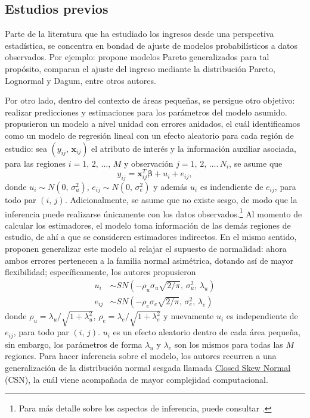 \documentclass[11pt]{article}
\begin{document}
\subsection{Estudios previos}
\label{subsec:estudios-previos}

Parte de la literatura que ha estudiado los ingresos desde una perspectiva estadística, se concentra en bondad de ajuste de modelos probabilísticos a datos observados. Por ejemplo: \textcite{arnold:2015} propone modelos Pareto generalizados para tal propósito, \textcite{sergio:2012} comparan el ajuste del  ingreso mediante la distribución Pareto, Lognormal y Dagum, entre otros autores.

Por otro lado, dentro del contexto de áreas pequeñas, se persigue otro objetivo: realizar predicciones y estimaciones para los parámetros del modelo asumido. \textcite{BHF} propusieron un modelo a nivel unidad con errores anidados, el cuál identificamos como un modelo de regresión lineal con un efecto aleatorio para cada región de estudio: sea $(y_{ij},\, \boldsymbol{x}_{ij})$ el atributo de interés y la información auxiliar asociada, para las regiones $i=1,\, 2,\, \ldots,\, M$ y observación $j=1,\, 2,\, \ldots.\, N_{i}$, se asume que
\begin{equation}
\label{eq:modelo-lineal-mixto}
y_{ij} = \boldsymbol{x}_{ij}^{T}\boldsymbol{\beta} + u_{i} + e_{ij},
\end{equation}
donde $u_{i}\sim N(0,\, \sigma^{2}_{u})$, $e_{ij}\sim N(0,\, \sigma^{2}_{e})$ y además $u_{i}$ es indendiente de $e_{ij}$, para todo par $(i,\, j)$. Adicionalmente, se asume que no existe sesgo, de modo que la inferencia puede realizarse únicamente con los datos observados.\footnote{Para más detalle sobre los aspectos de inferencia, puede consultar \textcite[][]{rao:2015}.} Al momento de calcular los estimadores, el modelo toma información de las demás regiones de estudio, de ahí a que se consideren estimadores indirectos. En el mismo sentido, \textcite{BHF-SN} proponen generalizar este modelo al relajar el supuesto de normalidad: ahora ambos errores pertenecen a la familia normal asimétrica, dotando así de mayor flexibilidad; específicamente, los autores propusieron
\begin{equation}
\begin{aligned}
u_{i} &\sim SN(-\rho_{u}\sigma_{u}\sqrt{2/\pi},\, \sigma^{2}_{u},\, \lambda_{u}) \\
e_{ij} &\sim SN(-\rho_{e}\sigma_{e}\sqrt{2/\pi},\, \sigma^{2}_{e},\, \lambda_{e})
\end{aligned}
\end{equation}
donde $\rho_{u} = \lambda_{u}/ \sqrt{1 + \lambda_{u}^{2}}$, $\rho_{e} = \lambda_{e}/ \sqrt{1 + \lambda_{e}^{2}}$ y nuevamente $u_{i}$ es independiente de $e_{ij}$, para todo par $(i,\, j)$.
$u_{i}$ es un efecto aleatorio dentro de cada área pequeña, sin embargo, los parámetros de forma $\lambda_{u}$ y $\lambda_{e}$ son los mismos para todas las $M$ regiones. Para hacer inferencia sobre el modelo, los autores recurren a una generalización de la distribución normal sesgada llamada \underline{Closed Skew Normal} (CSN), la cuál viene acompañada de mayor complejidad computacional.
\end{document}
